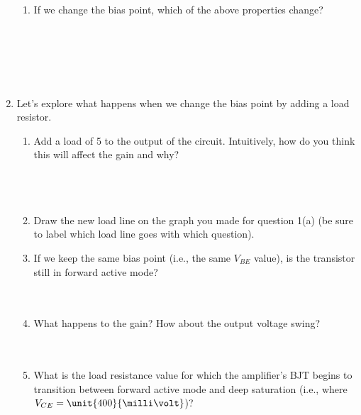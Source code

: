 \documentclass{article}
\begin{document}
\begin{enumerate}
\begin{enumerate}
		\item If we change the bias point, which of the above properties change?
		~\\~\\~\\~\\~\\~\\
	\end{enumerate}

	\item Let's explore what happens when we change the bias point by adding a load resistor.
	
	\begin{enumerate}
		
		\item Add a load of \unit{5}{\kilo\ohm} to the output of the circuit. Intuitively, how do you think this will affect the gain and why?
		~\\~\\~\\~\\

		\item Draw the new load line on the graph you made for question 1(a) (be sure to label which load line goes with which question).

		\item If we keep the same bias point (i.e., the same $V_{BE}$ value), is the transistor still in forward active mode?
		~\\~\\~\\

		\item What happens to the gain? How about the output voltage swing? 
		~\\~\\~\\

		\item What is the load resistance value for which the amplifier's BJT begins to transition between forward active mode and deep saturation (i.e., where $V_{CE} = \unit{400}{\milli\volt}$)?
		~\\~\\~\\~\\~\\

	\end{enumerate}
	
\end{enumerate}
\end{document}
